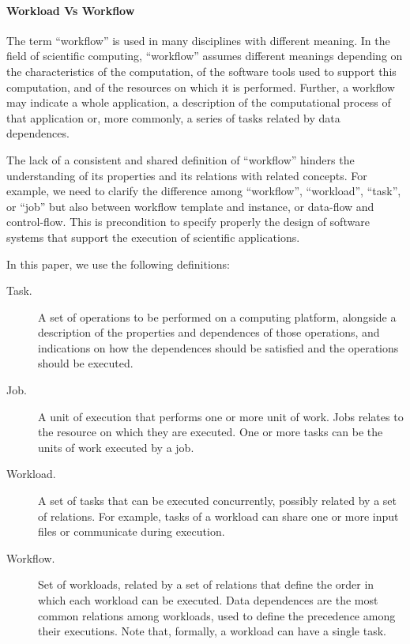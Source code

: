 \paragraph*{Workload Vs Workflow} The term ``workflow'' is used in many
disciplines with different meaning. In the field of scientific computing,
``workflow'' assumes different meanings depending on the characteristics of the
computation, of the software tools used to support this computation, and of the
resources on which it is performed. Further, a workflow may indicate a whole
application, a description of the computational process of that application or,
more commonly, a series of tasks related by data dependences.

The lack of a consistent and shared definition of ``workflow'' hinders the
understanding of its properties and its relations with related concepts. For
example, we need to clarify the difference among ``workflow'', ``workload'',
``task'', or ``job'' but also between workflow template and instance, or
data-flow and control-flow. This is precondition to specify properly the design
of software systems that support the execution of scientific applications.

In this paper, we use the following definitions:

\begin{description}

  \item[Task.] A set of operations to be performed on a computing platform,
  alongside a description of the properties and dependences of those operations,
  and indications on how the dependences should be satisfied and the operations
  should be executed.

  \item[Job.] A unit of execution that performs one or more unit of work. Jobs
  relates to the resource on which they are executed. One or more tasks can be
  the units of work executed by a job.

  \item[Workload.] A set of tasks that can be executed concurrently, possibly
  related by a set of relations. For example, tasks of a workload can share one
  or more input files or communicate during execution.

  \item[Workflow.] Set of workloads, related by a set of relations that define
  the order in which each workload can be executed. Data dependences are the
  most common relations among workloads, used to define the precedence among
  their executions. Note that, formally, a workload can have a single task.

\end{description}

